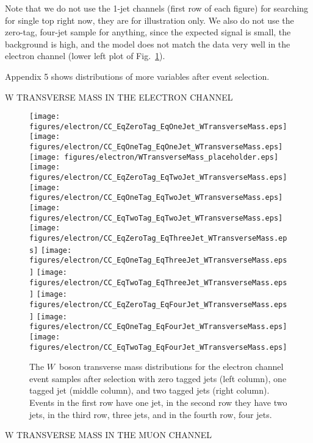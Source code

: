 Note that we do not use the 1-jet channels (first row of each figure)
for searching for single top right now, they are for illustration
only. We also do not use the zero-tag, four-jet sample for anything,
since the expected signal is small, the background is high, and the
model does not match the data very well in the electron channel (lower
left plot of Fig.~\ref{MTW-electron}).

Appendix 5 shows distributions of more variables after event
selection.

\begin{center}
W TRANSVERSE MASS IN THE ELECTRON CHANNEL
\end{center}

\begin{figure}[!h!tbp]
\texttt{[image: figures/electron/CC\_EqZeroTag\_EqOneJet\_WTransverseMass.eps]}  
\texttt{[image: figures/electron/CC\_EqOneTag\_EqOneJet\_WTransverseMass.eps]}   
\texttt{[image: figures/electron/WTransverseMass\_placeholder.eps]}            
\texttt{[image: figures/electron/CC\_EqZeroTag\_EqTwoJet\_WTransverseMass.eps]}  
\texttt{[image: figures/electron/CC\_EqOneTag\_EqTwoJet\_WTransverseMass.eps]}   
\texttt{[image: figures/electron/CC\_EqTwoTag\_EqTwoJet\_WTransverseMass.eps]}   
\texttt{[image: figures/electron/CC\_EqZeroTag\_EqThreeJet\_WTransverseMass.eps]}
\texttt{[image: figures/electron/CC\_EqOneTag\_EqThreeJet\_WTransverseMass.eps]} 
\texttt{[image: figures/electron/CC\_EqTwoTag\_EqThreeJet\_WTransverseMass.eps]} 
\texttt{[image: figures/electron/CC\_EqZeroTag\_EqFourJet\_WTransverseMass.eps]} 
\texttt{[image: figures/electron/CC\_EqOneTag\_EqFourJet\_WTransverseMass.eps]}  
\texttt{[image: figures/electron/CC\_EqTwoTag\_EqFourJet\_WTransverseMass.eps]}  
\vspace{-0.1in}
\caption[MTWelectron]{The $W$~boson transverse mass distributions for
the electron channel event samples after selection with zero tagged
jets (left column), one tagged jet (middle column), and two tagged
jets (right column). Events in the first row have one jet, in the
second row they have two jets, in the third row, three jets, and in
the fourth row, four jets.}
\label{MTW-electron}
\end{figure}

\clearpage

\begin{center}
W TRANSVERSE MASS IN THE MUON CHANNEL
\end{center}

